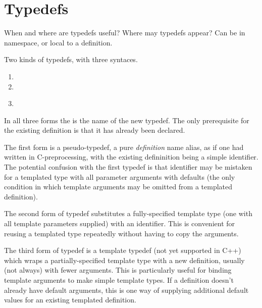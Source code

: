 
\chapter{Typedefs}
\label{sec:typedefs}

When and where are typedefs useful?  
Where may typedefs appear?
Can be in namespace, or local to a definition.  

Two kinds of typedefs, with three syntaces.  

\begin{enumerate}
\item {}  \ttt{;}
\item {}  
	\ttt{<}  \ttt{>} \ttt{;}
\item {} \ttt{<}  \ttt{>}\\
	  
	\ttt{<}  \ttt{>} \ttt{;}
\end{enumerate}

In all three forms the  is the name of the new
typedef.  
The only prerequisite for the existing definition is that it has already 
been declared.  

The first form is a pseudo-typedef, a pure \emph{definition} name alias, 
as if one had written 
   in C-preprocessing, 
with the existing defininition being a simple identifier.  
The potential confusion with the first typedef is that 
 identifier may be mistaken for a templated type
with all parameter arguments with defaults 
(the only condition in which template arguments 
may be omitted from a templated definition).  

The second form of typedef substitutes a fully-specified template type
(one with all template parameters supplied) with an identifier.  
This is convenient for reusing a templated type repeatedly without
having to copy the arguments.  

The third form of typedef is a template typedef (not yet supported in C++)
which wraps a partially-specified template type with a new definition, 
usually (not always) with fewer arguments.  
This is particularly useful for binding template arguments
to make simple template types.  
If a definition doesn't already have default arguments, 
this is one way of supplying additional default values 
for an existing templated definition.  

